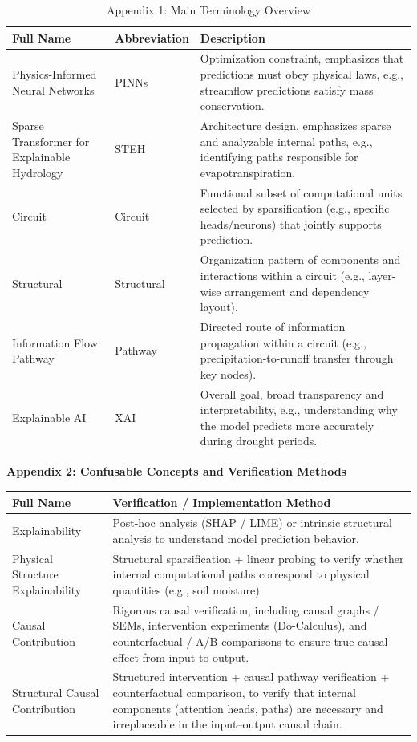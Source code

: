 \begin{table}[htbp]
\centering
\caption{Appendix 1: Main Terminology Overview}
\label{tab:terminology_overview}
\begin{tabularx}{\textwidth}{p{3cm} p{2cm} X}
\toprule
\textbf{Full Name} & \textbf{Abbreviation} & \textbf{Description} \\
\midrule
Physics-Informed Neural Networks & PINNs & Optimization constraint, emphasizes that predictions must obey physical laws, e.g., streamflow predictions satisfy mass conservation. \\
Sparse Transformer for Explainable Hydrology & STEH & Architecture design, emphasizes sparse and analyzable internal paths, e.g., identifying paths responsible for evapotranspiration. \\
Circuit & Circuit & Functional subset of computational units selected by sparsification (e.g., specific heads/neurons) that jointly supports prediction. \\
Structural & Structural & Organization pattern of components and interactions within a circuit (e.g., layer-wise arrangement and dependency layout). \\
Information Flow Pathway & Pathway & Directed route of information propagation within a circuit (e.g., precipitation-to-runoff transfer through key nodes). \\
Explainable AI & XAI & Overall goal, broad transparency and interpretability, e.g., understanding why the model predicts more accurately during drought periods. \\
\bottomrule
\end{tabularx}
\end{table}

\begin{table}[htbp]
\centering
\noindent\textbf{Appendix 2: Confusable Concepts and Verification Methods}
\vspace{0.5em}
\begin{tabularx}{\textwidth}{p{4cm} X}
\toprule
\textbf{Full Name} & \textbf{Verification / Implementation Method} \\
\midrule
Explainability & Post-hoc analysis (SHAP / LIME) or intrinsic structural analysis to understand model prediction behavior. \\
Physical Structure Explainability & Structural sparsification + linear probing to verify whether internal computational paths correspond to physical quantities (e.g., soil moisture). \\
Causal Contribution & Rigorous causal verification, including causal graphs / SEMs, intervention experiments (Do-Calculus), and counterfactual / A/B comparisons to ensure true causal effect from input to output. \\
Structural Causal Contribution & Structured intervention + causal pathway verification + counterfactual comparison, to verify that internal components (attention heads, paths) are necessary and irreplaceable in the input–output causal chain. \\
\bottomrule
\end{tabularx}
\end{table}
\FloatBarrier